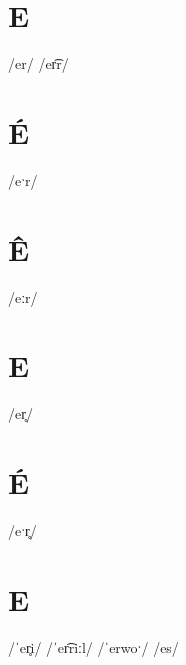 \documentclass[10pt,a4paper,twoside]{book}
\begin{document}
\section*{E}

\begin{multicols}{3}
 {/er/} {}
 {/er͡r/} {}
\end{multicols}

\section*{É}

\begin{multicols}{3}
 {/eˑr/} {}
\end{multicols}

\section*{Ê}

\begin{multicols}{3}
 {/eːr/} {}
\end{multicols}

\section*{E}

\begin{multicols}{3}
 {/er̥/} {}
\end{multicols}

\section*{É}

\begin{multicols}{3}
 {/eˑr̥/} {}
\end{multicols}

\section*{E}

\begin{multicols}{3}
 {/ˈer̥i/} {}
 {/ˈer͡riːl/} {}
 {/ˈerwoˑ/} {}
 {/es/} {}
\end{multicols}
\end{document}
